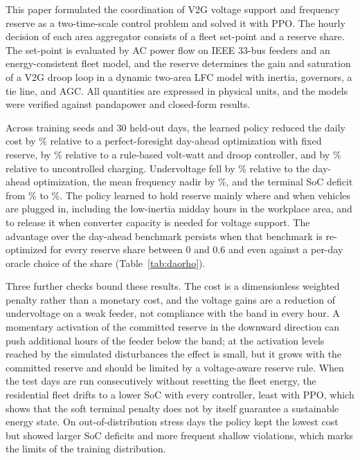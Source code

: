 This paper formulated the coordination of V2G voltage support and
frequency reserve as a two-time-scale control problem and solved it
with PPO. The hourly decision of each area aggregator consists of a
fleet set-point and a reserve share. The set-point is evaluated by AC
power flow on IEEE 33-bus feeders and an energy-consistent fleet model,
and the reserve determines the gain and saturation of a V2G droop loop
in a dynamic two-area LFC model with inertia, governors, a tie line,
and AGC. All quantities are expressed in physical units, and the
models were verified against pandapower and closed-form results.

Across \NSeed{} training seeds and 30 held-out days, the learned policy
reduced the daily cost by \TRedCostDAO\% relative to a perfect-foresight
day-ahead optimization with fixed reserve, by \TRedCostRB\% relative to
a rule-based volt-watt and droop controller, and by \TRedCostUC\%
relative to uncontrolled charging. Undervoltage fell by
\TRedUvPuHDAO\% relative to the day-ahead optimization, the mean
frequency nadir by \TRedNadirMeanHzDAO\%, and the terminal SoC deficit
from \TDAOSocDefPct\% to \TPPOSocDefPct\%. The policy learned to hold
reserve mainly where and when vehicles are plugged in, including the
low-inertia midday hours in the workplace area, and to release it when
converter capacity is needed for voltage support. The advantage over
the day-ahead benchmark persists when that benchmark is re-optimized
for every reserve share between 0 and 0.6 and even against a per-day
oracle choice of the share (Table~\ref{tab:daorho}).

Three further checks bound these results. The cost is a dimensionless
weighted penalty rather than a monetary cost, and the voltage gains
are a reduction of undervoltage on a weak feeder, not compliance with
the band in every hour. A momentary activation of the committed
reserve in the downward direction can push additional hours of the
feeder below the band; at the activation levels reached by the
simulated disturbances the effect is small, but it grows with the
committed reserve and should be limited by a voltage-aware reserve
rule. When the test days are run consecutively without resetting the
fleet energy, the residential fleet drifts to a lower SoC with every
controller, least with PPO, which shows that the soft terminal
penalty does not by itself guarantee a sustainable energy state. On
out-of-distribution stress days the policy kept the lowest cost but
showed larger SoC deficits and more frequent shallow violations,
which marks the limits of the training distribution.

